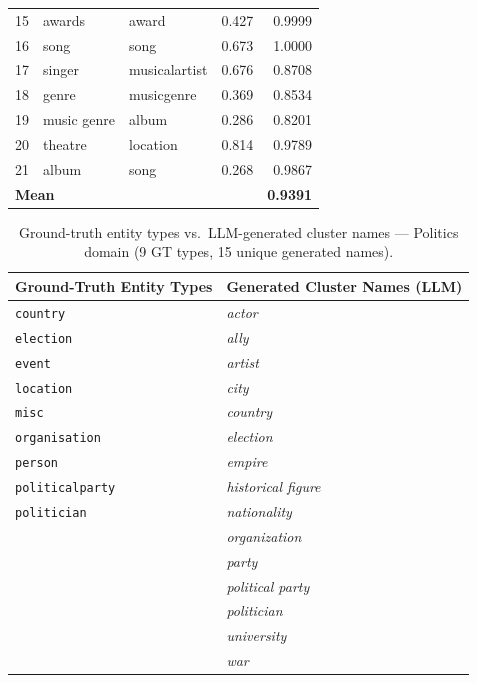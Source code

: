 \documentclass[11pt,a4paper]{article}
\begin{document}
\begin{table}[ht]
\begin{tabular}{r l l r r}
  15 & awards                         & award                  & 0.427 & \cellcolor{green!15}0.9999 \\
  16 & song                           & song                   & 0.673 & \cellcolor{green!15}1.0000 \\
  17 & singer                         & musicalartist          & 0.676 & \cellcolor{red!15}0.8708 \\
  18 & genre                          & musicgenre             & 0.369 & \cellcolor{red!15}0.8534 \\
  19 & music genre                    & album                  & 0.286 & \cellcolor{red!15}0.8201 \\
  20 & theatre                        & location               & 0.814 & \cellcolor{yellow!25}0.9789 \\
  21 & album                          & song                   & 0.268 & \cellcolor{yellow!25}0.9867 \\
\midrule
\multicolumn{3}{l}{\textbf{Mean}} & & \textbf{0.9391} \\
\bottomrule
\end{tabular}
\end{table}

\FloatBarrier

\begin{table}[ht]
\centering
\footnotesize
\caption{Ground-truth entity types vs.\ LLM-generated cluster names --- Politics domain
(9 GT types, 15 unique generated names).}
\label{tab:gt_map_politics}
\setlength{\tabcolsep}{8pt}
\begin{tabular}{l l}
\toprule
\textbf{Ground-Truth Entity Types} & \textbf{Generated Cluster Names (LLM)} \\
\midrule
  \texttt{country} & \textit{actor} \\
  \texttt{election} & \textit{ally} \\
  \texttt{event} & \textit{artist} \\
  \texttt{location} & \textit{city} \\
  \texttt{misc} & \textit{country} \\
  \texttt{organisation} & \textit{election} \\
  \texttt{person} & \textit{empire} \\
  \texttt{politicalparty} & \textit{historical figure} \\
  \texttt{politician} & \textit{nationality} \\
   & \textit{organization} \\
   & \textit{party} \\
   & \textit{political party} \\
   & \textit{politician} \\
   & \textit{university} \\
   & \textit{war} \\
\bottomrule
\end{tabular}
\end{table}
\end{document}
